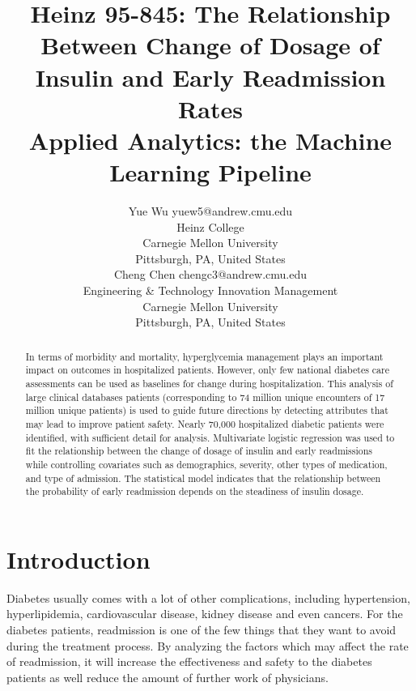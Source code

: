 \documentclass[twoside,11pt]{article}
\begin{document}
\title{Heinz 95-845: The Relationship Between Change of Dosage of Insulin and Early Readmission Rates  \\ Applied Analytics: the Machine Learning Pipeline}

\author{\name Yue Wu \email yuew5@andrew.cmu.edu \\
       \addr Heinz College\\
       Carnegie Mellon University\\
       Pittsburgh, PA, United States \\
       \AND
       \name  Cheng Chen \email chengc3@andrew.cmu.edu \\
       \addr Engineering \& Technology Innovation Management\\
       Carnegie Mellon University\\
       Pittsburgh, PA, United States}

\maketitle

\begin{abstract}

In terms of morbidity and mortality, hyperglycemia management plays an important impact on outcomes in hospitalized patients. However, only few national diabetes care assessments can be used as baselines for change during hospitalization. This analysis of large clinical databases patients (corresponding to 74 million unique encounters of 17 million unique patients) is used to guide future directions by detecting attributes that may lead to improve patient safety. Nearly 70,000 hospitalized diabetic patients were identified, with sufficient detail for analysis. Multivariate logistic regression was used to fit the relationship between the change of dosage of insulin and early readmissions while controlling covariates such as demographics, severity, other types of medication, and type of admission. The statistical model indicates that the relationship between the probability of early readmission depends on the steadiness of insulin dosage.
\end{abstract}



\section{Introduction}
Diabetes usually comes with a lot of other complications, including hypertension, hyperlipidemia, cardiovascular disease, kidney disease and even cancers. For the diabetes patients, readmission is one of the few things that they want to avoid during the treatment process. By analyzing the factors which may affect the rate of readmission, it will increase the effectiveness and safety to the diabetes patients as well reduce the amount of further work of physicians.  
\end{document}

